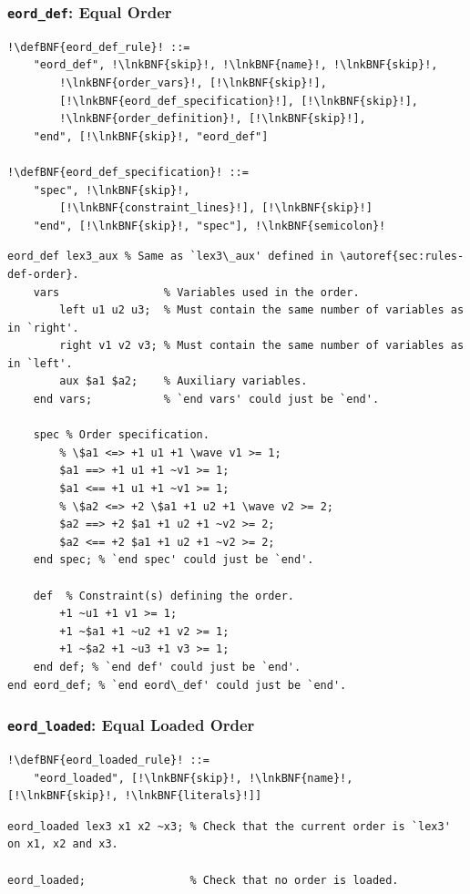 \documentclass[a4paper]{article}
\newcommand{\defBNF}[1]{\hypertarget{def:#1}{<\detokenize{#1}>}}
\newcommand{\lnkBNF}[1]{\hyperlink{def:#1}{<\detokenize{#1}>}}
\newcommand{\wave}[0]{\raisebox{0.5ex}{\texttildelow}}
\begin{document}
\subsubsection{\texttt{eord\_def}: Equal Order}\label{sec:rules-eord-def}
\begin{lstlisting}
!\defBNF{eord_def_rule}! ::=
	"eord_def", !\lnkBNF{skip}!, !\lnkBNF{name}!, !\lnkBNF{skip}!,
		!\lnkBNF{order_vars}!, [!\lnkBNF{skip}!],
		[!\lnkBNF{eord_def_specification}!], [!\lnkBNF{skip}!],
		!\lnkBNF{order_definition}!, [!\lnkBNF{skip}!],
	"end", [!\lnkBNF{skip}!, "eord_def"]

!\defBNF{eord_def_specification}! ::=
	"spec", !\lnkBNF{skip}!,
		[!\lnkBNF{constraint_lines}!], [!\lnkBNF{skip}!]
	"end", [!\lnkBNF{skip}!, "spec"], !\lnkBNF{semicolon}!
\end{lstlisting}
\begin{lstlisting}[language=veripb]
eord_def lex3_aux % Same as `lex3\_aux' defined in \autoref{sec:rules-def-order}.
	vars                % Variables used in the order.
		left u1 u2 u3;  % Must contain the same number of variables as in `right'.
		right v1 v2 v3; % Must contain the same number of variables as in `left'.
		aux $a1 $a2;    % Auxiliary variables.
	end vars;           % `end vars' could just be `end'.

	spec % Order specification.
		% \$a1 <=> +1 u1 +1 \wave v1 >= 1;
		$a1 ==> +1 u1 +1 ~v1 >= 1;
		$a1 <== +1 u1 +1 ~v1 >= 1;
		% \$a2 <=> +2 \$a1 +1 u2 +1 \wave v2 >= 2;
		$a2 ==> +2 $a1 +1 u2 +1 ~v2 >= 2;
		$a2 <== +2 $a1 +1 u2 +1 ~v2 >= 2;
	end spec; % `end spec' could just be `end'.

	def  % Constraint(s) defining the order.
		+1 ~u1 +1 v1 >= 1;
		+1 ~$a1 +1 ~u2 +1 v2 >= 1;
		+1 ~$a2 +1 ~u3 +1 v3 >= 1;
	end def; % `end def' could just be `end'.
end eord_def; % `end eord\_def' could just be `end'.
\end{lstlisting}


\subsubsection{\texttt{eord\_loaded}: Equal Loaded Order}\label{sec:rules-eord-loaded}
\begin{lstlisting}
!\defBNF{eord_loaded_rule}! ::=
	"eord_loaded", [!\lnkBNF{skip}!, !\lnkBNF{name}!, [!\lnkBNF{skip}!, !\lnkBNF{literals}!]]
\end{lstlisting}
\begin{lstlisting}[language=veripb]
eord_loaded lex3 x1 x2 ~x3; % Check that the current order is `lex3' on x1, x2 and x3.

eord_loaded;                % Check that no order is loaded.
\end{lstlisting}
\end{document}
